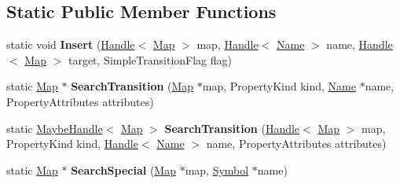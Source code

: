 \subsection*{Static Public Member Functions}
\begin{DoxyCompactItemize}
\item 
static void {\bfseries Insert} (\hyperlink{classv8_1_1internal_1_1_handle}{Handle}$<$ \hyperlink{classv8_1_1internal_1_1_map}{Map} $>$ map, \hyperlink{classv8_1_1internal_1_1_handle}{Handle}$<$ \hyperlink{classv8_1_1internal_1_1_name}{Name} $>$ name, \hyperlink{classv8_1_1internal_1_1_handle}{Handle}$<$ \hyperlink{classv8_1_1internal_1_1_map}{Map} $>$ target, Simple\+Transition\+Flag flag)\hypertarget{classv8_1_1internal_1_1_transition_array_a77f009434ca36aaf2e120786923cce4b}{}\label{classv8_1_1internal_1_1_transition_array_a77f009434ca36aaf2e120786923cce4b}

\item 
static \hyperlink{classv8_1_1internal_1_1_map}{Map} $\ast$ {\bfseries Search\+Transition} (\hyperlink{classv8_1_1internal_1_1_map}{Map} $\ast$map, Property\+Kind kind, \hyperlink{classv8_1_1internal_1_1_name}{Name} $\ast$name, Property\+Attributes attributes)\hypertarget{classv8_1_1internal_1_1_transition_array_a96f0d7f94aea4b251a8c2600a6502339}{}\label{classv8_1_1internal_1_1_transition_array_a96f0d7f94aea4b251a8c2600a6502339}

\item 
static \hyperlink{classv8_1_1internal_1_1_maybe_handle}{Maybe\+Handle}$<$ \hyperlink{classv8_1_1internal_1_1_map}{Map} $>$ {\bfseries Search\+Transition} (\hyperlink{classv8_1_1internal_1_1_handle}{Handle}$<$ \hyperlink{classv8_1_1internal_1_1_map}{Map} $>$ map, Property\+Kind kind, \hyperlink{classv8_1_1internal_1_1_handle}{Handle}$<$ \hyperlink{classv8_1_1internal_1_1_name}{Name} $>$ name, Property\+Attributes attributes)\hypertarget{classv8_1_1internal_1_1_transition_array_a174ce7b3cf747f4fc37a425f9eadcdbc}{}\label{classv8_1_1internal_1_1_transition_array_a174ce7b3cf747f4fc37a425f9eadcdbc}

\item 
static \hyperlink{classv8_1_1internal_1_1_map}{Map} $\ast$ {\bfseries Search\+Special} (\hyperlink{classv8_1_1internal_1_1_map}{Map} $\ast$map, \hyperlink{classv8_1_1internal_1_1_symbol}{Symbol} $\ast$name)\hypertarget{classv8_1_1internal_1_1_transition_array_a2f8fa05ad05f0437d95a2e4dcdb4f505}{}\label{classv8_1_1internal_1_1_transition_array_a2f8fa05ad05f0437d95a2e4dcdb4f505}


\end{DoxyCompactItemize}
